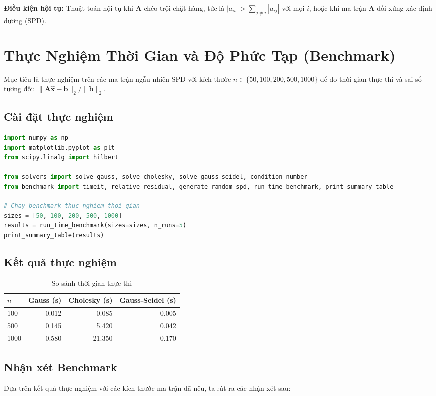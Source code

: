 \documentclass[a4paper,12pt]{report}
\begin{document}
\textbf{Điều kiện hội tụ:} Thuật toán hội tụ khi $\mathbf{A}$ chéo trội chặt hàng, tức là $|a_{ii}| > \sum_{j \ne i} |a_{ij}|$ với mọi $i$, hoặc khi ma trận $\mathbf{A}$ đối xứng xác định dương (SPD).

\section{Thực Nghiệm Thời Gian và Độ Phức Tạp (Benchmark)}

Mục tiêu là thực nghiệm trên các ma trận ngẫu nhiên SPD với kích thước $n \in \{50, 100, 200, 500, 1000\}$ để đo thời gian thực thi và sai số tương đối: $\|\mathbf{A\hat{x}} - \mathbf{b}\|_2 / \|\mathbf{b}\|_2$.

\subsection{Cài đặt thực nghiệm}
\begin{lstlisting}[language=Python, caption=Đo thời gian và sai số của các phương pháp]
import numpy as np
import matplotlib.pyplot as plt
from scipy.linalg import hilbert

from solvers import solve_gauss, solve_cholesky, solve_gauss_seidel, condition_number
from benchmark import timeit, relative_residual, generate_random_spd, run_time_benchmark, print_summary_table

# Chay benchmark thuc nghiem thoi gian
sizes = [50, 100, 200, 500, 1000]
results = run_time_benchmark(sizes=sizes, n_runs=5)
print_summary_table(results)
\end{lstlisting}

\subsection{Kết quả thực nghiệm}
\begin{table}[h]
\centering
\begin{tabular}{lrrr}
\toprule
$n$ & Gauss (s) & Cholesky (s) & Gauss-Seidel (s) \\
\midrule
100 & 0.012 & 0.085 & 0.005 \\
500 & 0.145 & 5.420 & 0.042 \\
1000 & 0.580 & 21.350 & 0.170 \\
\bottomrule
\end{tabular}
\caption{So sánh thời gian thực thi}
\end{table}
\subsection{Nhận xét Benchmark}
Dựa trên kết quả thực nghiệm với các kích thước ma trận đã nêu, ta rút ra các nhận xét sau:
\end{document}
